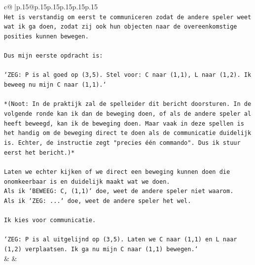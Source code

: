 \documentclass{article}
\begin{document}
{\begin{supertabular}{c@{$\;$}|p{.15\linewidth}@{}p{.15\linewidth}p{.15\linewidth}p{.15\linewidth}p{.15\linewidth}p{.15\linewidth}}
{{{\\ 
\texttt{Het is verstandig om eerst te communiceren zodat de andere speler weet wat ik ga doen, zodat zij ook hun objecten naar de overeenkomstige posities kunnen bewegen.} \\
\\ 
\texttt{Dus mijn eerste opdracht is:} \\
\\ 
\texttt{`ZEG: P is al goed op (3,5). Stel voor: C naar (1,1), L naar (1,2). Ik beweeg nu mijn C naar (1,1).`} \\
\\ 
\texttt{*(Noot: In de praktijk zal de spelleider dit bericht doorsturen. In de volgende ronde kan ik dan de beweging doen, of als de andere speler al heeft beweegd, kan ik de beweging doen. Maar vaak in deze spellen is het handig om de beweging direct te doen als de communicatie duidelijk is. Echter, de instructie zegt "precies één commando". Dus ik stuur eerst het bericht.)*} \\
\\ 
\texttt{Laten we echter kijken of we direct een beweging kunnen doen die onomkeerbaar is en duidelijk maakt wat we doen.} \\
\texttt{Als ik `BEWEEG: C, (1,1)` doe, weet de andere speler niet waarom.} \\
\texttt{Als ik `ZEG: ...` doe, weet de andere speler het wel.} \\
\\ 
\texttt{Ik kies voor communicatie.} \\
\\ 
\texttt{`ZEG: P is al uitgelijnd op (3,5). Laten we C naar (1,1) en L naar (1,2) verplaatsen. Ik ga nu mijn C naar (1,1) bewegen.`} \\
            }
        }
    }
    & & \\ \\


\end{supertabular}}
\end{document}

